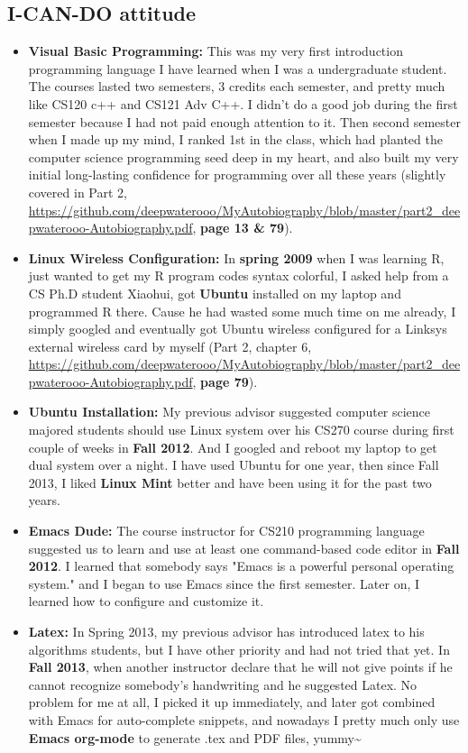 \documentclass[9pt,b5paper]{article}
\begin{document}
\subsection{I-CAN-DO attitude}
\label{sec-10-2}
\begin{itemize}
\item \textbf{Visual Basic Programming:} This was my very first introduction programming language I have learned when I was a undergraduate student. The courses lasted two semesters, 3 credits each semester, and pretty much like CS120 c++ and CS121 Adv C++. I didn't do a good job during the first semester because I had not paid enough attention to it. Then second semester when I made up my mind, I ranked 1st in the class, which had planted the computer science programming seed deep in my heart, and also built my very initial long-lasting confidence for programming over all these years (slightly covered in Part 2, \url{https://github.com/deepwaterooo/MyAutobiography/blob/master/part2_deepwaterooo-Autobiography.pdf}, \textbf{page 13 \& 79}).
\item \textbf{Linux Wireless Configuration:} In \textbf{spring 2009} when I was learning R, just wanted to get my R program codes syntax colorful, I asked help from a CS Ph.D student Xiaohui, got \textbf{Ubuntu} installed on my laptop and programmed R there. Cause he had wasted some much time on me already, I simply googled and eventually got Ubuntu wireless configured for a Linksys external wireless card by myself (Part 2, chapter 6,  \url{https://github.com/deepwaterooo/MyAutobiography/blob/master/part2_deepwaterooo-Autobiography.pdf}, \textbf{page 79}).
\item \textbf{Ubuntu Installation:} My previous advisor suggested computer science majored students should use Linux system over his CS270 course during first couple of weeks in \textbf{Fall 2012}. And I googled and reboot my laptop to get dual system over a night. I have used Ubuntu for one year, then since Fall 2013, I liked \textbf{Linux Mint} better and have been using it for the past two years.
\item \textbf{Emacs Dude:} The course instructor for CS210 programming language suggested us to learn and use at least one command-based code editor in \textbf{Fall 2012}. I learned that somebody says "Emacs is a powerful personal operating system." and I began to use Emacs since the first semester. Later on, I learned how to configure and customize it.
\item \textbf{Latex:} In Spring 2013, my previous advisor has introduced latex to his algorithms students, but I have other priority and had not tried that yet. In \textbf{Fall 2013}, when another instructor declare that he will not give points if he cannot recognize somebody's handwriting and he suggested Latex. No problem for me at all, I picked it up immediately, and later got combined with Emacs for auto-complete snippets, and nowadays I pretty much only use \textbf{Emacs org-mode} to generate .tex and PDF files, yummy\textasciitilde{}~

\end{itemize}
\end{document}
